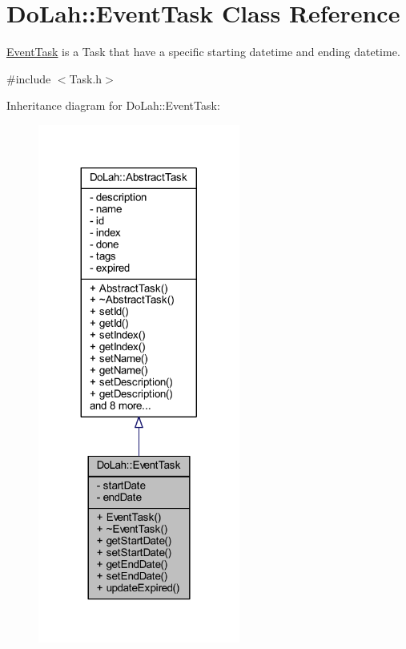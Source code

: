 \hypertarget{class_do_lah_1_1_event_task}{}\section{Do\+Lah\+:\+:Event\+Task Class Reference}
\label{class_do_lah_1_1_event_task}


\hyperlink{class_do_lah_1_1_event_task}{Event\+Task} is a Task that have a specific starting datetime and ending datetime.  




{\ttfamily \#include $<$Task.\+h$>$}



Inheritance diagram for Do\+Lah\+:\+:Event\+Task\+:\nopagebreak
\begin{figure}[H]
\begin{center}
\leavevmode
\includegraphics[width=188pt]{class_do_lah_1_1_event_task__inherit__graph}
\end{center}
\end{figure}


